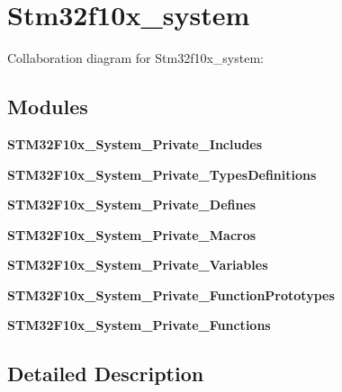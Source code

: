 \section{Stm32f10x\+\_\+system}
\label{group__stm32f10x__system}
Collaboration diagram for Stm32f10x\+\_\+system\+:
\subsection*{Modules}
\begin{DoxyCompactItemize}
\item 
\textbf{ S\+T\+M32\+F10x\+\_\+\+System\+\_\+\+Private\+\_\+\+Includes}
\item 
\textbf{ S\+T\+M32\+F10x\+\_\+\+System\+\_\+\+Private\+\_\+\+Types\+Definitions}
\item 
\textbf{ S\+T\+M32\+F10x\+\_\+\+System\+\_\+\+Private\+\_\+\+Defines}
\item 
\textbf{ S\+T\+M32\+F10x\+\_\+\+System\+\_\+\+Private\+\_\+\+Macros}
\item 
\textbf{ S\+T\+M32\+F10x\+\_\+\+System\+\_\+\+Private\+\_\+\+Variables}
\item 
\textbf{ S\+T\+M32\+F10x\+\_\+\+System\+\_\+\+Private\+\_\+\+Function\+Prototypes}
\item 
\textbf{ S\+T\+M32\+F10x\+\_\+\+System\+\_\+\+Private\+\_\+\+Functions}
\end{DoxyCompactItemize}


\subsection{Detailed Description}
